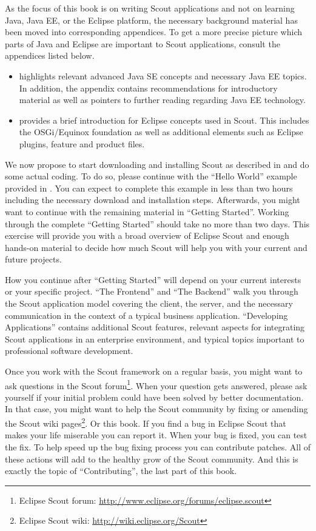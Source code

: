 \documentclass[a4paper,10pt,twoside]{book}
\begin{document}
As the focus of this book is on writing Scout applications and not on learning Java, Java EE, or the Eclipse platform, the necessary background material has been moved into corresponding appendices.
To get a more precise picture which parts of Java and Eclipse are important to Scout applications, consult the appendices listed below.

\begin{itemize}
  \item {} highlights relevant advanced Java SE concepts and necessary Java EE topics. 
        In addition, the appendix contains recommendations for introductory material as well as pointers to further reading regarding Java EE technology.
  \item {} provides a brief introduction for Eclipse concepts used in Scout. 
        This includes the OSGi/Equinox foundation as well as additional elements such as Eclipse plugins, feature and product files.
\end{itemize}

We now propose to start downloading and installing Scout as described in  and do some actual coding.
To do so, please continue with the ``Hello World'' example provided in .
You can expect to complete this example in less than two hours including the necessary download and installation steps.
Afterwards, you might want to continue with the remaining material in ``Getting Started''. 
Working through the complete ``Getting Started'' should take no more than two days. 
This exercise will provide you with a broad overview of Eclipse Scout and enough hands-on material to decide how much Scout will help you with your current and future projects.

How you continue after ``Getting Started'' will depend on your current interests or your specific project. 
``The Frontend'' and ``The Backend'' walk you through the Scout application model covering the client, the server, and the necessary communication in the context of a typical business application.
``Developing Applications'' contains additional Scout features, relevant aspects for integrating Scout applications in an enterprise environment, and typical topics important to professional software development.

Once you work with the Scout framework on a regular basis, you might want to ask questions in the Scout 
forum\footnote{Eclipse Scout forum: \url{http://www.eclipse.org/forums/eclipse.scout}}.
When your question gets answered, please ask yourself if your initial problem could have been solved by better documentation.
In that case, you might want to help the Scout community by fixing or amending the Scout wiki pages\footnote{Eclipse Scout wiki: \url{http://wiki.eclipse.org/Scout}}.
Or this book. 
If you find a bug in Eclipse Scout that makes your life miserable you can report it. 
When your bug is fixed, you can test the fix.
To help speed up the bug fixing process you can contribute patches.
All of these actions will add to the healthy grow of the Scout community.
And this is exactly the topic of ``Contributing'', the last part of this book.
\end{document}
